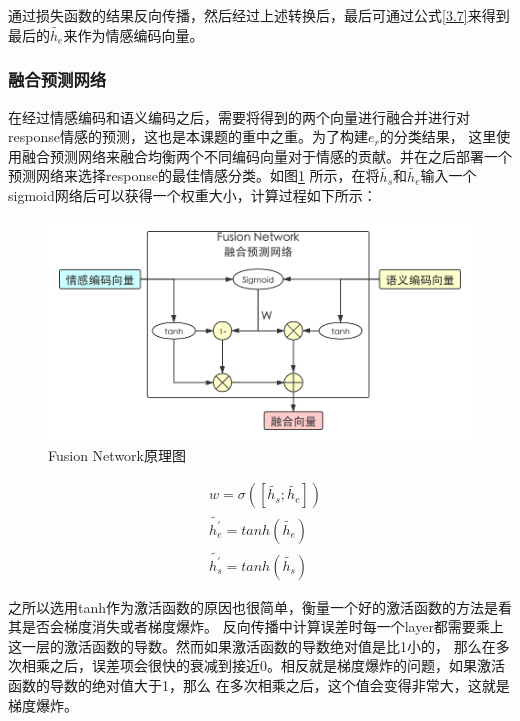 \documentclass[supercite]{HustGraduPaper}
\theoremstyle{definition}
\begin{document}
通过损失函数的结果反向传播，然后经过上述转换后，最后可通过公式\ref{3.7}来得到最后的$\widetilde{h_e}$来作为情感编码向量。

\subsubsection{融合预测网络}
在经过情感编码和语义编码之后，需要将得到的两个向量进行融合并进行对response情感的预测，这也是本课题的重中之重。为了构建$e_r$的分类结果，
这里使用融合预测网络来融合均衡两个不同编码向量对于情感的贡献。并在之后部署一个预测网络来选择response的最佳情感分类。如图\ref{Fig.fusionnetwork}
所示，在将$\widetilde{h_s}$和$\widetilde{h_e}$输入一个sigmoid网络后可以获得一个权重大小，计算过程如下所示：

\begin{figure}[htbp] %
  \centering %
  \includegraphics[width=1\textwidth]{images/fusionnetwork.png} %
  \caption{Fusion Network原理图} %
  \label{Fig.fusionnetwork} %
\end{figure}

\begin{align}
  &w = \sigma([\widetilde{h_s};\widetilde{h_e}]) \label{3.10}\\
  &{\widetilde{h_e^{'}}} = tanh(\widetilde{h_e}) \label{3.11}\\
  &{\widetilde{h_s^{'}}} = tanh(\widetilde{h_s}) \label{3.12}
\end{align}

之所以选用tanh作为激活函数的原因也很简单，衡量一个好的激活函数的方法是看其是否会梯度消失或者梯度爆炸。
反向传播中计算误差时每一个layer都需要乘上这一层的激活函数的导数。然而如果激活函数的导数绝对值是比1小的，
那么在多次相乘之后，误差项会很快的衰减到接近0。相反就是梯度爆炸的问题，如果激活函数的导数的绝对值大于1，那么
在多次相乘之后，这个值会变得非常大，这就是梯度爆炸。
\end{document}
